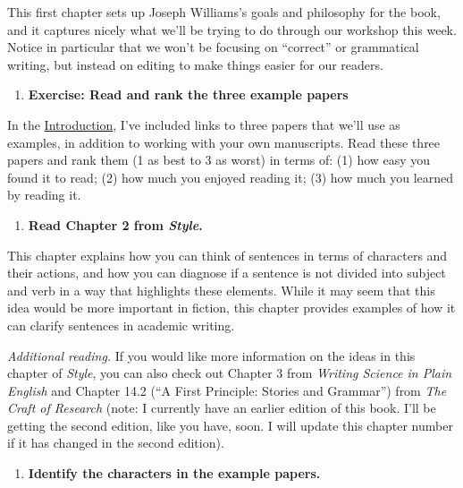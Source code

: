 \documentclass[]{tufte-book}
\providecommand{\tightlist}{%
  \setlength{\itemsep}{0pt}\setlength{\parskip}{0pt}}
\begin{document}
This first chapter sets up Joseph Williams's goals and philosophy for the book,
and it captures nicely what we'll be trying to do through our workshop this
week. Notice in particular that we won't be focusing on ``correct'' or grammatical
writing, but instead on editing to make things easier for our readers.

\begin{enumerate}
\def\labelenumi{\arabic{enumi}.}
\setcounter{enumi}{1}
\tightlist
\item
  \textbf{Exercise: Read and rank the three example papers}
\end{enumerate}

In the
\href{https://geanders.github.io/writing_workshop/1-1-readings-for-the-workshop.html\#readings-for-the-workshop}{Introduction},
I've included links to three papers that we'll use as examples, in addition to
working with your own manuscripts. Read these three papers and rank them (1 as
best to 3 as worst) in terms of: (1) how easy you found it to read; (2) how much
you enjoyed reading it; (3) how much you learned by reading it.

\begin{enumerate}
\def\labelenumi{\arabic{enumi}.}
\setcounter{enumi}{2}
\tightlist
\item
  \textbf{Read Chapter 2 from \emph{Style}.}
\end{enumerate}

This chapter explains how you can think of sentences in terms of characters and
their actions, and how you can diagnose if a sentence is not divided into
subject and verb in a way that highlights these elements. While it may seem that
this idea would be more important in fiction, this chapter provides examples of how
it can clarify sentences in academic writing.

\emph{Additional reading.} If you would like more information on the ideas in this
chapter of \emph{Style}, you can also check out Chapter 3 from \emph{Writing Science in Plain English}
and Chapter 14.2 (``A First Principle: Stories and Grammar'') from \emph{The Craft of Research}
(note: I currently have an earlier edition of this book. I'll be getting the second edition,
like you have, soon. I will update this chapter number if it has changed in the second
edition).

\begin{enumerate}
\def\labelenumi{\arabic{enumi}.}
\setcounter{enumi}{3}
\tightlist
\item
  \textbf{Identify the characters in the example papers.}
\end{enumerate}
\end{document}
